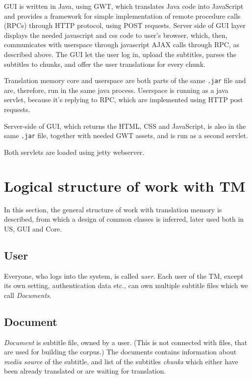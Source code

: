 GUI is written in Java, using GWT, which translates Java code into JavaScript and provides a framework for simple implementation of remote procedure calls (RPCs) through HTTP protocol, using POST requests. Server side of GUI layer displays the needed javascript and css code to user's browser, which, then, communicates with userspace through javascript AJAX calls through RPC, as described above. The GUI let the user log in, upload the subtitles, parses the subtitles to chunks, and offer the user translations for every chunk. 

Translation memory core and userspace are both parts of the same \texttt{.jar} file and are, therefore, run in the same java process. Userspace is running as a java servlet, because it's replying to RPC, which are implemented using HTTP post requests.

Server-side of GUI, which returns the HTML, CSS and JavaScript, is also in the same \texttt{.jar} file, together with needed GWT assets, and is run as a second servlet.

Both servlets are loaded using jetty webserver.

\section{Logical structure of work with TM}

In this section, the general structure of work with translation memory is described, from which a design of common classes is inferred, later used both in US, GUI and Core.




\subsection*{User}
Everyone, who logs into the system, is called \emph{user}. Each user of the TM, except its own setting, authentication data etc., can own multiple subtitle files which we call \emph{Documents}.

\subsection*{Document}
\emph{Document} is subtitle file, owned by a user. (This is not connected with files, that are used for building the corpus.) The documents contains information about \emph{media source} of the subtitle, and list of the subtitles \emph{chunks} which either have been already translated or are waiting for translation.

